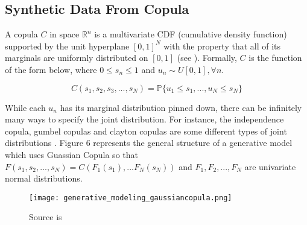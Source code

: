 \documentclass[12pt]{article}
\newcommand{\1}{\mathbbm 1}
\begin{document}
		
		
		
		
		
		\subsection{Synthetic Data From Copula}
		
		A copula $C$ in space $\mathbb{R}^{n}$ is a multivariate CDF (cumulative density function) supported by the unit hyperplane $[0,1]^{N}$ with the property that all of its marginals are uniformly distributed on $[0,1]$ (see \cite{stachurski2016primer}). Formally, $C$ is the function of the form below, where $0 \leq s_{n} \leq 1$ and $u_{n} \sim U[0, 1], \forall n$.
		
		\begin{equation}
			C(s_{1}, s_{2}, s_{3}, ... ,s_{N}) = \mathbb{P}\{u_{1} \leq s_{1}, ... , u_{N} \leq s_{N}\}
		\end{equation}
		
		While each $u_{n}$ has its marginal distribution pinned down, there can be infinitely many ways to specify the joint distribution. For instance, the independence copula, gumbel copulas and clayton copulas are some different types of joint distributions \cite{stachurski2016primer}. Figure 6 represents the general structure of a generative model which uses Guassian Copula so that $F(s_{1}, s_{2}, ..., s_{N}) = C(F_{1}(s_{1}), ... F_{N}(s_{N}))$ and $F_{1}, F_{2}, ... ,F_{N}$ are univariate normal distributions.
		
		
		
		
		
		
		
		
		
		
		
		
		
		
		
		
		
		\begin{figure}[H]
			\begin{Center}
				\texttt{[image: generative\_modeling\_gaussiancopula.png]}
				\caption{Source is  \cite{patki2016synthetic}}
			\end{Center}
		\end{figure}
		
		
		
\end{document}
